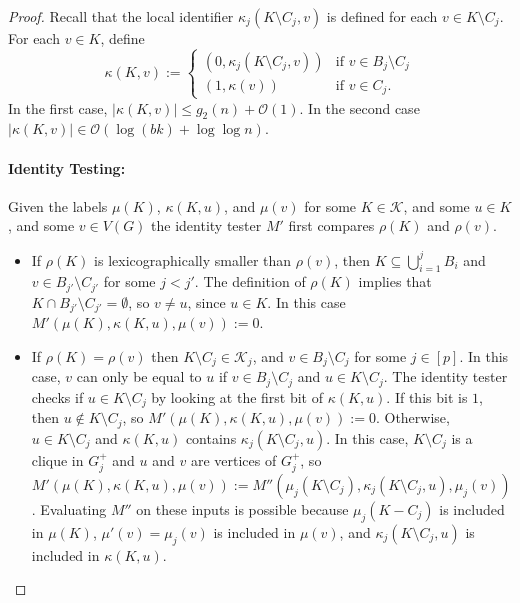 \documentclass{patmorin}
\renewcommand{\le}{\leqslant}
\newcommand{\Oh}{\mathcal{O}}
\begin{document}
\begin{proof}
    Recall that the local identifier $\kappa_j(K\setminus C_j,v)$ is defined for each $v\in K\setminus C_j$.
    For each $v\in K$, define
    \[
         \kappa(K,v):=
         \begin{cases}
           (0,\kappa_j(K\setminus C_j,v)) & \text{if $v\in B_j\setminus C_j$} \\
           (1,\kappa(v)) & \text{if $v\in C_j$.}
         \end{cases}
     \]
     In the first case, $|\kappa(K,v)|\le g_2(n)+\Oh(1)$.
     In the second case $|\kappa(K,v)|\in \Oh(\log(bk)+\log\log n)$.


     \paragraph{Identity Testing:}
     Given the labels $\mu(K)$, $\kappa(K,u)$, and $\mu(v)$ for some $K\in\mathcal{K}$, and some $u\in K$, and some $v\in V(G)$ the identity tester $M'$ first compares $\rho(K)$ and $\rho(v)$.
     \begin{itemize}
       \item If $\rho(K)$ is lexicographically smaller than $\rho(v)$, then $K\subseteq\bigcup_{i=1}^j B_i$ and $v\in B_{j'}\setminus C_{j'}$ for some $j < j'$.
       The definition of $\rho(K)$ implies that $K\cap B_{j'}\setminus C_{j'}=\emptyset$, so $v\neq u$, since $u\in K$. In this case $M'(\mu(K),\kappa(K,u),\mu(v)):=0$.

       \item If $\rho(K)=\rho(v)$ then $K\setminus C_j\in\mathcal{K}_j$, and $v\in B_j\setminus C_j$ for some $j\in[p]$.
       In this case, $v$ can only be equal to $u$ if $v\in B_j\setminus C_j$ and $u\in K\setminus C_j$.
       The identity tester checks if $u\in K\setminus C_j$ by looking at the first bit of $\kappa(K,u)$.  If this bit is $1$, then $u\not\in K\setminus C_j$, so $M'(\mu(K),\kappa(K,u),\mu(v)):=0$.  Otherwise, $u\in K\setminus C_j$ and $\kappa(K,u)$ contains $\kappa_j(K\setminus C_j,u)$.  In this case, $K\setminus C_j$ is a clique in $G^+_j$ and $u$ and $v$ are vertices of $G^+_j$, so  $M'(\mu(K),\kappa(K,u),\mu(v)):=M''(\mu_j(K\setminus C_j),\kappa_j(K\setminus C_j,u),\mu_j(v))$.  Evaluating $M''$ on these inputs is possible because $\mu_j(K-C_j)$ is included in $\mu(K)$, $\mu'(v)=\mu_j(v)$ is included in $\mu(v)$, and $\kappa_j(K\setminus C_j,u)$ is included in $\kappa(K,u)$.


\end{itemize}
\end{proof}
\end{document}
